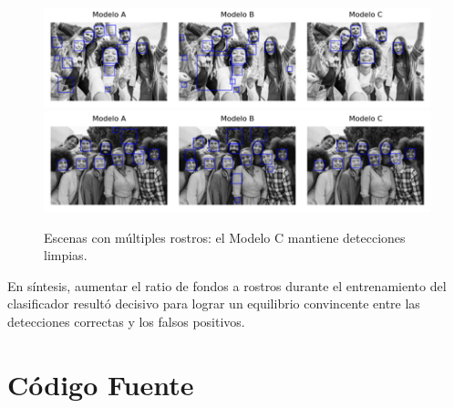 \documentclass{article}
\begin{document}
\begin{figure}[H]
  \centering
  \includegraphics[width=\linewidth]{tarea_6/imagenes/6-faces.png}\\[4pt]
  \includegraphics[width=\linewidth]{tarea_6/imagenes/10-faces.png}
  \caption{Escenas con múltiples rostros: el Modelo C mantiene detecciones limpias.}
  \label{fig:modelos-10f}
\end{figure}

En síntesis, aumentar el ratio de fondos a rostros durante el entrenamiento del clasificador resultó decisivo para lograr un equilibrio convincente entre las detecciones correctas y los falsos positivos.


\pagebreak

\appendix

\section*{Código Fuente}
\end{document}
